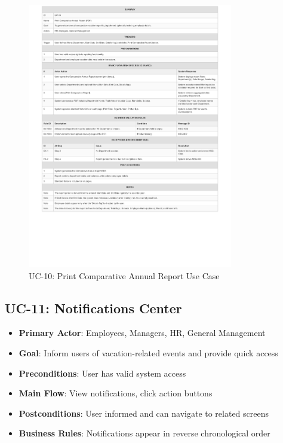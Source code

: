 \documentclass[12pt,a4paper]{article}
\begin{document}
\begin{figure}[H]
\centering
\includegraphics[width=0.8\textwidth]{Use-Cases/UC-10-Print-Comparative-Annual-Report/UC-10-Print-Comparative-Annual-Report-1.png}
\caption{UC-10: Print Comparative Annual Report Use Case}
\label{fig:uc10}
\end{figure}

\subsection{UC-11: Notifications Center}
\begin{itemize}
    \item \textbf{Primary Actor}: Employees, Managers, HR, General Management
    \item \textbf{Goal}: Inform users of vacation-related events and provide quick access
    \item \textbf{Preconditions}: User has valid system access
    \item \textbf{Main Flow}: View notifications, click action buttons
    \item \textbf{Postconditions}: User informed and can navigate to related screens
    \item \textbf{Business Rules}: Notifications appear in reverse chronological order
\end{itemize}
\end{document}
